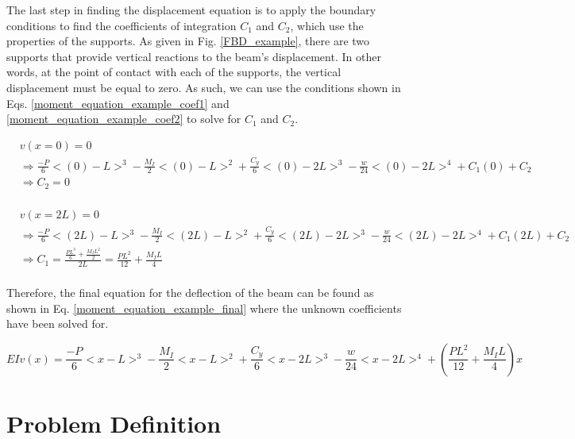 \documentclass[a4paper]{article}
\begin{document}
The last step in finding the displacement equation is to apply the boundary conditions to find the coefficients of integration $C_1$ and $C_2$, which use the properties of the supports. As given in Fig. \ref{FBD_example}, there are two supports that provide vertical reactions to the beam's displacement. In other words, at the point of contact with each of the supports, the vertical displacement must be equal to zero. As such, we can use the conditions shown in Eqs. \ref{moment_equation_example_coef1} and \ref{moment_equation_example_coef2} to solve for $C_1$ and $C_2$.

\begin{equation}
    \begin{split}
    	& v(x=0) = 0  \\
 	& \Rightarrow \frac{-P}{6}<(0)-L>^3 - \frac{M_I}{2}<(0)-L>^2 + \frac{C_y}{6}<(0)-2L>^3 - \frac{w}{24}<(0)-2L>^4 + C_1 (0) + C_2 \\
	& \Rightarrow C_2 = 0 \\
    \end{split}
\label{moment_equation_example_coef1}
\end{equation}

\begin{equation}
    \begin{split}
	& v(x=2L) = 0  \\
 	& \Rightarrow \frac{-P}{6}<(2L)-L>^3 - \frac{M_I}{2}<(2L)-L>^2 + \frac{C_y}{6}<(2L)-2L>^3 - \frac{w}{24}<(2L)-2L>^4 + C_1 (2L) + C_2 \\
	& \Rightarrow C_1 = \frac{\frac{PL^3}{6} + \frac{M_I L^2}{2}}{2L} = \frac{PL^2}{12} + \frac{M_I L}{4} \\
    \end{split}
\label{moment_equation_example_coef2}
\end{equation}

Therefore, the final equation for the deflection of the beam can be found as shown in Eq. \ref{moment_equation_example_final} where the unknown coefficients have been solved for.

\begin{equation}
EI v(x) = \frac{-P}{6}<x-L>^3 - \frac{M_I}{2}<x-L>^2 + \frac{C_y}{6}<x-2L>^3 - \frac{w}{24}<x-2L>^4 + \left( \frac{PL^2}{12} + \frac{M_I L}{4} \right) x
\label{moment_equation_example_final}
\end{equation}

\section{Problem Definition} \label{Problems}
\end{document}

